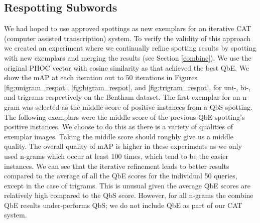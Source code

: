 \documentclass[ms,electronic,twosidetoc,letterpaper,chaptercenter,parttop,lof,lot]{byumsphd}
\begin{document}

\subsection{Respotting Subwords}

We had hoped to use approved spottings as new exemplars for an iterative CAT (computer assisted transcription) system. To verify the validity of this approach we created an experiment where we continually refine spotting results by spotting with new exemplars and merging the results (see Section \ref{combine}). We use the original PHOC vector with cosine similarity as that achieved the best QbE. We show the mAP at each iteration out to 50 iterations in Figures \ref{fig:unigram_respot}, \ref{fig:bigram_respot}, and \ref{fig:trigram_respot}, for uni-, bi-, and trigrams respectively on the Bentham dataset. The first exemplar for an n-gram was selected as the middle score of positive instances from a QbS spotting. The following exemplars were the middle score of the previous QbE spotting's positive instances. We choose to do this as there is a variety of qualities of exemplar images. Taking the middle score should roughly give us a middle quality.
The overall quality of mAP is higher in these experiments as we only used n-grams which occur at least 100 times, which tend to be the easier instances.
We can see that the iterative refinement leads to better results compared to the average of all the QbE scores for the individual 50 queries, except in the case of trigrams. This is unusual given the average QbE scores are relatively high compared to the QbS score. However, for all n-grams the combine QbE results under-performs QbS; we do not include QbE as part of our CAT system.
\end{document}
